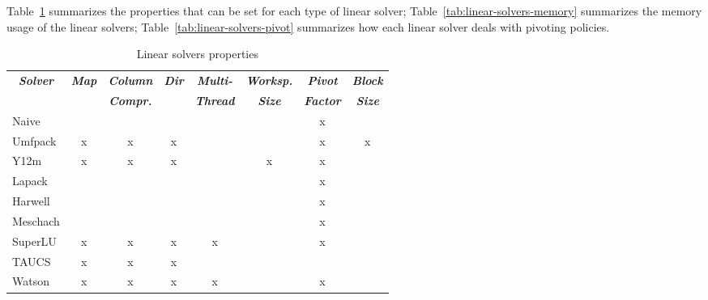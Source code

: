 \noindent
Table~\ref{tab:linear-solvers-props} summarizes the properties that can be set
for each type of linear solver; Table~\ref{tab:linear-solvers-memory}
summarizes  the memory usage of the linear solvers;
Table~\ref{tab:linear-solvers-pivot}
summarizes how each linear solver deals with pivoting policies.

\begin{table}
\centering
\caption{Linear solvers properties}\label{tab:linear-solvers-props}
\begin{tabular}{lccccccc}
\hline\hline
	\multicolumn{1}{c}{\textbf{\emph{Solver}}} &
	\multicolumn{1}{c}{\textbf{\emph{Map}}} &
	\multicolumn{1}{c}{\textbf{\emph{Column}}} &
	\multicolumn{1}{c}{\textbf{\emph{Dir}}} &
	\multicolumn{1}{c}{\textbf{\emph{Multi-}}} &
	\multicolumn{1}{c}{\textbf{\emph{Worksp.}}} &
	\multicolumn{1}{c}{\textbf{\emph{Pivot}}} &
	\multicolumn{1}{c}{\textbf{\emph{Block}}} \\
	& & \multicolumn{1}{c}{\textbf{\emph{Compr.}}} &
	& \multicolumn{1}{c}{\textbf{\emph{Thread}}}
	& \multicolumn{1}{c}{\textbf{\emph{Size}}}
	& \multicolumn{1}{c}{\textbf{\emph{Factor}}}
	& \multicolumn{1}{c}{\textbf{\emph{Size}}} \\
\hline
	Naive		& 	&	&	&	&	& x	&	\\
	Umfpack		& x	& x	& x	&	&	& x	& x	\\
	Y12m		& x	& x	& x	&	& x	& x	&	\\
	Lapack		&	&	&	&	&	& x	&	\\
	Harwell		&	&	&	&	&	& x	&	\\
	Meschach	&	&	&	&	&	& x	&	\\
	SuperLU		& x	& x	& x	& x	&	& x	&	\\
	TAUCS		& x	& x	& x	&	&	&	&	\\
	Watson		& x	& x	& x	& x	&	& x	&	\\
\hline\hline
\end{tabular}
\end{table}

\noindent

